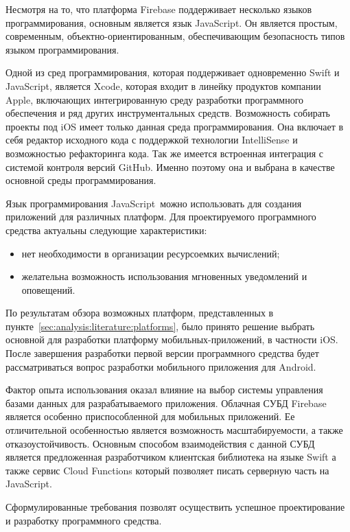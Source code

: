 Несмотря на то, что платформа Firebase поддерживает несколько языков программирования, основным является язык JavaScript. Он является простым, современным, объектно-ориентированным, обеспечивающим безопасность типов языком программирования.

Одной из сред программирования, которая поддерживает одновременно Swift и JavaScript, является Xcode, которая входит в линейку продуктов компании Apple, включающих интегрированную среду разработки программного обеспечения и ряд других инструментальных средств. Возможность собирать проекты под iOS имеет только данная среда программирования. Она включает в себя редактор исходного кода с поддержкой технологии In\-tel\-li\-Sen\-se и возможностью рефакторинга кода. Так же имеется встроенная интеграция с системой контроля версий GitHub. Именно поэтому она и выбрана в качестве основной среды программирования.

Язык программирования JavaScript~можно использовать для создания приложений для различных платформ. Для проектируемого программного сре\-д\-с\-т\-ва актуальны следующие характеристики:
\begin{itemize}
  \item нет необходимости в организации ресурсоемких вычислений;
  \item желательна возможность использования мгновенных уведомлений и оповещений.
\end{itemize}

По результатам обзора возможных платформ, представленных в пункте~\ref{sec:analysis:literature:platforms}, было принято решение выбрать основной для разработки платформу мобильных-приложений, в частности iOS. После завершения разработки первой версии программного средства будет рассматриваться вопрос разработки мобильного приложения для Android.

Фактор опыта использования оказал влияние на выбор  системы управления базами данных для разрабатываемого приложения. Облачная СУБД Firebase является особенно приспособленной для мобильных приложений. Ее отличительной особенностью является возможность масштабируемости, а также отказоустойчивость. Основным способом взаимодействия с данной СУБД является предложенная разработчиком клиентская библиотека на языке Swift а также сервис Cloud Functions который позволяет писать серверную часть на JavaScript.

Сформулированные требования позволят осуществить успешное проектирование и разработку программного средства.
